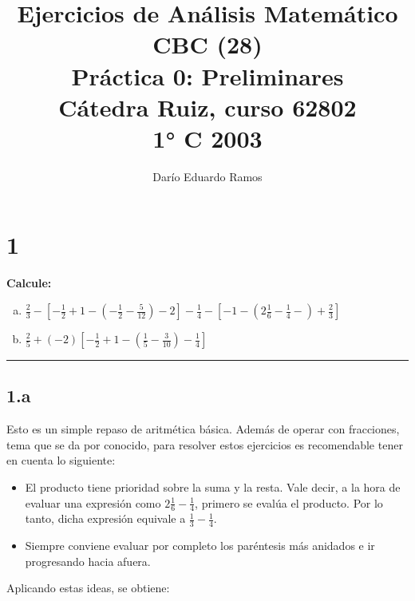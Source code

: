 \documentclass{article}
\title{Ejercicios de Análisis Matemático CBC (28) \\
Práctica 0: Preliminares \\
Cátedra Ruiz, curso 62802 \\
1° C 2003}
\author{Darío Eduardo Ramos}
\begin{document}
\maketitle

\tableofcontents{}

\newpage

\section*{1}
\label{sec:1}

\textbf{Calcule:}

\begin{enumerate}[(a)]
\bfseries

\item $\frac{2}{3} - \left[ -\frac{1}{2} + 1 - \left( -\frac{1}{2} - \frac{5}{12} \right) - 2  \right] -\frac{1}{4} - \left[ -1 -\left(2 \frac{1}{6} - \frac{1}{4} -\right) +\frac{2}{3} \right]$

\item $\frac{2}{5} + (-2) \left[ -\frac{1}{2} + 1 -\left( \frac{1}{5} -\frac{3}{10} \right) -\frac{1}{4} \right]$

\end{enumerate}
\hrule

\subsection*{1.a}
\label{subsec:1.a}

Esto es un simple repaso de aritmética básica. Además de operar con fracciones, tema que se da por conocido, para resolver estos ejercicios es recomendable tener en cuenta lo siguiente:

\begin{itemize}
\item El producto tiene prioridad sobre la suma y la resta. Vale decir, a la hora de evaluar una expresión como $2 \frac{1}{6} - \frac{1}{4}$, primero se evalúa el producto. Por lo tanto, dicha expresión equivale a $\frac{1}{3} - \frac{1}{4}$.

\item Siempre conviene evaluar por completo los paréntesis más anidados e ir progresando hacia afuera.
\end{itemize}

Aplicando estas ideas, se obtiene:
\end{document}
